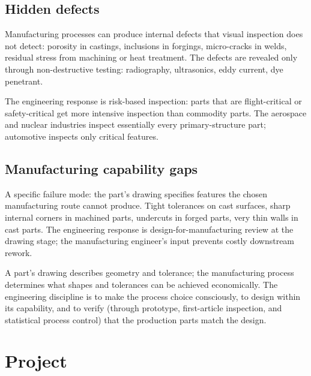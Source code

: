 \subsection{Hidden defects}

Manufacturing processes can produce internal defects that visual inspection does not detect: porosity in castings, inclusions in forgings, micro-cracks in welds, residual stress from machining or heat treatment. The defects are revealed only through non-destructive testing: radiography, ultrasonics, eddy current, dye penetrant.

The engineering response is risk-based inspection: parts that are flight-critical or safety-critical get more intensive inspection than commodity parts. The aerospace and nuclear industries inspect essentially every primary-structure part; automotive inspects only critical features.

\subsection{Manufacturing capability gaps}

A specific failure mode: the part's drawing specifies features the chosen manufacturing route cannot produce. Tight tolerances on cast surfaces, sharp internal corners in machined parts, undercuts in forged parts, very thin walls in cast parts. The engineering response is design-for-manufacturing review at the drawing stage; the manufacturing engineer's input prevents costly downstream rework.

\begin{principle}
A part's drawing describes geometry and tolerance; the manufacturing process determines what shapes and tolerances can be achieved economically. The engineering discipline is to make the process choice consciously, to design within its capability, and to verify (through prototype, first-article inspection, and statistical process control) that the production parts match the design.
\end{principle}

\section{Project}

